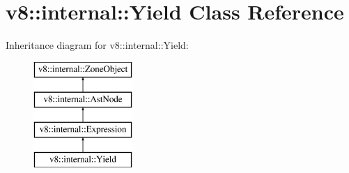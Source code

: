 \hypertarget{classv8_1_1internal_1_1_yield}{}\section{v8\+:\+:internal\+:\+:Yield Class Reference}
\label{classv8_1_1internal_1_1_yield}
Inheritance diagram for v8\+:\+:internal\+:\+:Yield\+:\begin{figure}[H]
\begin{center}
\leavevmode
\includegraphics[height=4.000000cm]{classv8_1_1internal_1_1_yield}
\end{center}
\end{figure}
